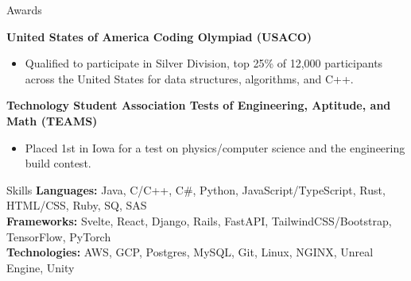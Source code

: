 \documentclass{resume} %
\begin{document}
\begin{rSection}{Awards} 
  \vspace{-1.25em}
  \item \textbf{United States of America Coding Olympiad (USACO)} 
  \begin{itemize}
     \itemsep -3pt {} 
       \item Qualified to participate in Silver Division, top 25\% of 12,000 participants across the United States for data
       structures, algorithms, and C++.
  \end{itemize}

  \item \textbf{Technology Student Association Tests of Engineering, Aptitude, and Math (TEAMS)} 
  \begin{itemize}
     \itemsep -3pt {} 
       \item Placed 1st in Iowa for a test on physics/computer science and the engineering build contest.
       
  \end{itemize}

\end{rSection}

\begin{rSection}{Skills} 
\textbf{Languages:} Java, C/C++, C\#, Python, JavaScript/TypeScript, Rust, HTML/CSS, Ruby, SQ, SAS \\
\textbf{Frameworks:} Svelte, React, Django, Rails, FastAPI, TailwindCSS/Bootstrap, TensorFlow, PyTorch\\
\textbf{Technologies:} AWS, GCP, Postgres, MySQL, Git, Linux, NGINX, Unreal Engine, Unity

\end{rSection}
\end{document}
